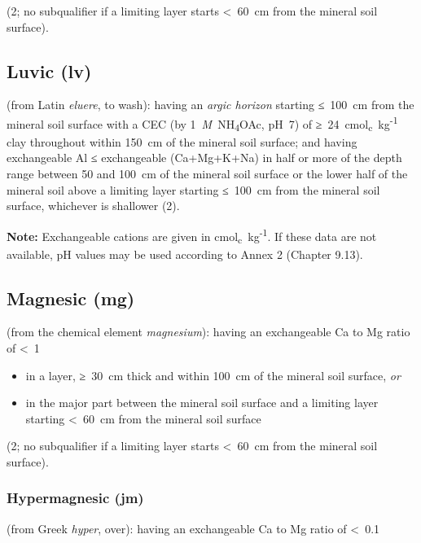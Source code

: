 \documentclass[
  letterpaper,
  DIV=11,
  numbers=noendperiod]{scrreprt}
\providecommand{\tightlist}{%
  \setlength{\itemsep}{0pt}\setlength{\parskip}{0pt}}\usepackage{longtable,booktabs,array}
\begin{document}
(2; no subqualifier if a limiting layer starts \textless~60~cm from the
mineral soil surface).

\hypertarget{luvic-lv}{%
\subsection{Luvic (lv)}\label{luvic-lv}}

(from Latin \emph{eluere}, to wash): having an \emph{argic horizon}
starting ≤~100~cm from the mineral soil surface with a CEC (by
1~\emph{M}~NH\textsubscript{4}OAc, pH~7) of
≥~24~cmol\textsubscript{c}~kg\textsuperscript{-1} clay throughout within
150~cm of the mineral soil surface; and having exchangeable Al ≤
exchangeable (Ca+Mg+K+Na) in half or more of the depth range between 50
and 100~cm of the mineral soil surface or the lower half of the mineral
soil above a limiting layer starting ≤~100~cm from the mineral soil
surface, whichever is shallower (2).

\textbf{Note:} Exchangeable cations are given in
cmol\textsubscript{c}~kg\textsuperscript{-1}. If these data are not
available, pH values may be used according to Annex 2 (Chapter 9.13).

\hypertarget{magnesic-mg}{%
\subsection{Magnesic (mg)}\label{magnesic-mg}}

(from the chemical element \emph{magnesium}): having an exchangeable Ca
to Mg ratio of \textless~1

\begin{itemize}
\tightlist
\item
  in a layer, ≥~30~cm thick and within 100~cm of the mineral soil
  surface, \emph{or}
\item
  in the major part between the mineral soil surface and a limiting
  layer starting \textless~60~cm from the mineral soil surface
\end{itemize}

(2; no subqualifier if a limiting layer starts \textless~60~cm from the
mineral soil surface).

\hypertarget{hypermagnesic-jm}{%
\subsubsection{Hypermagnesic (jm)}\label{hypermagnesic-jm}}

(from Greek \emph{hyper}, over): having an exchangeable Ca to Mg ratio
of \textless~0.1
\end{document}
